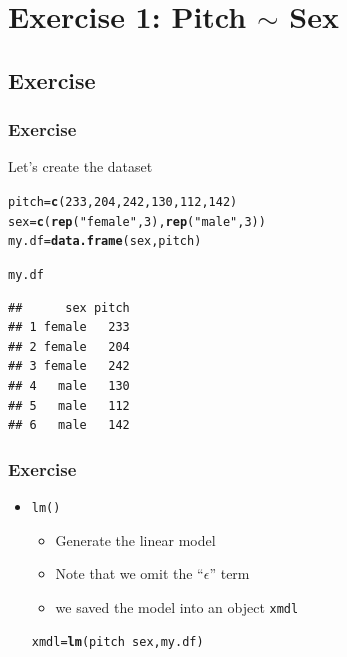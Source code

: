 \documentclass{beamer}\usepackage[]{graphicx}\usepackage[]{color}
\makeatletter
\newcommand{\hlnum}[1]{\textcolor[rgb]{0.686,0.059,0.569}{#1}}%
\newcommand{\hlstr}[1]{\textcolor[rgb]{0.192,0.494,0.8}{#1}}%
\newcommand{\hlopt}[1]{\textcolor[rgb]{0,0,0}{#1}}%
\newcommand{\hlstd}[1]{\textcolor[rgb]{0.345,0.345,0.345}{#1}}%
\newcommand{\hlkwb}[1]{\textcolor[rgb]{0.69,0.353,0.396}{#1}}%
\newcommand{\hlkwd}[1]{\textcolor[rgb]{0.737,0.353,0.396}{\textbf{#1}}}%
\newenvironment{kframe}{%
 \def\at@end@of@kframe{}%
 \ifinner\ifhmode%
  \def\at@end@of@kframe{\end{minipage}}%
  \begin{minipage}{\columnwidth}%
 \fi\fi%
 \def\FrameCommand##1{\hskip\@totalleftmargin \hskip-\fboxsep
 \colorbox{shadecolor}{##1}\hskip-\fboxsep
     \hskip-\linewidth \hskip-\@totalleftmargin \hskip\columnwidth}%
 \MakeFramed {\advance\hsize-\width
   \@totalleftmargin\z@ \linewidth\hsize
   \@setminipage}}%
 {\par\unskip\endMakeFramed%
 \at@end@of@kframe}
\newenvironment{knitrout}{}{} %
\makeatother
\begin{document}
\section[Exercise1]{Exercise 1: Pitch $\sim$ Sex}
\subsection{Exercise}

\begin{frame}[fragile]
\frametitle{Exercise}
Let's create the dataset
\begin{knitrout}
\color{fgcolor}\begin{kframe}
\begin{alltt}
\hlstd{pitch} \hlkwb{=} \hlkwd{c}\hlstd{(}\hlnum{233}\hlstd{,}\hlnum{204}\hlstd{,}\hlnum{242}\hlstd{,}\hlnum{130}\hlstd{,}\hlnum{112}\hlstd{,}\hlnum{142}\hlstd{)}
\hlstd{sex} \hlkwb{=} \hlkwd{c}\hlstd{(}\hlkwd{rep}\hlstd{(}\hlstr{"female"}\hlstd{,}\hlnum{3}\hlstd{),}\hlkwd{rep}\hlstd{(}\hlstr{"male"}\hlstd{,}\hlnum{3}\hlstd{))}
\hlstd{my.df} \hlkwb{=} \hlkwd{data.frame}\hlstd{(sex, pitch)}
\end{alltt}
\end{kframe}
\end{knitrout}

\pause

\begin{knitrout}
\color{fgcolor}\begin{kframe}
\begin{alltt}
\hlstd{my.df}
\end{alltt}
\begin{verbatim}
##      sex pitch
## 1 female   233
## 2 female   204
## 3 female   242
## 4   male   130
## 5   male   112
## 6   male   142
\end{verbatim}
\end{kframe}
\end{knitrout}
\end{frame}

\begin{frame}[fragile]
\frametitle{Exercise}
\begin{itemize}
\item \texttt{lm()}
	\begin{itemize}
	\item Generate the linear model
	\item Note that we omit the ``$\epsilon$'' term 
	\item we saved the model into an object \texttt{xmdl}
	\end{itemize}
\pause
\begin{knitrout}
\color{fgcolor}\begin{kframe}
\begin{alltt}
\hlstd{xmdl} \hlkwb{=} \hlkwd{lm}\hlstd{(pitch} \hlopt{~} \hlstd{sex, my.df)}
\end{alltt}
\end{kframe}
\end{knitrout}
\end{itemize}
\end{frame}
\end{document}
